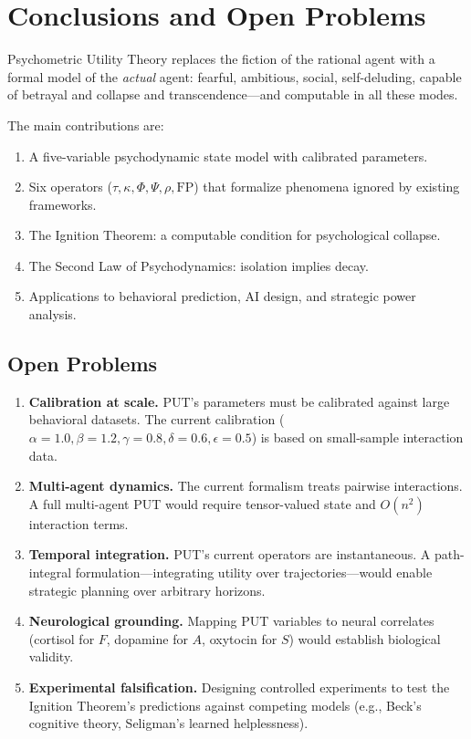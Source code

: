 \documentclass[12pt, a4paper]{article}
\theoremstyle{remark}
\begin{document}
\section{Conclusions and Open Problems}

Psychometric Utility Theory replaces the fiction of the rational agent
with a formal model of the \emph{actual} agent: fearful, ambitious,
social, self-deluding, capable of betrayal and collapse and
transcendence---and computable in all these modes.

The main contributions are:
\begin{enumerate}[nosep]
    \item A five-variable psychodynamic state model with calibrated
          parameters.
    \item Six operators ($\tau, \kappa, \Phi, \Psi, \rho, \text{FP}$)
          that formalize phenomena ignored by existing frameworks.
    \item The Ignition Theorem: a computable condition for psychological
          collapse.
    \item The Second Law of Psychodynamics: isolation implies decay.
    \item Applications to behavioral prediction, AI design, and strategic
          power analysis.
\end{enumerate}

\subsection{Open Problems}

\begin{enumerate}[nosep]
    \item \textbf{Calibration at scale.} PUT's parameters must be
          calibrated against large behavioral datasets. The current
          calibration ($\alpha = 1.0, \beta = 1.2, \gamma = 0.8,
          \delta = 0.6, \epsilon = 0.5$) is based on small-sample
          interaction data.
    \item \textbf{Multi-agent dynamics.} The current formalism treats
          pairwise interactions. A full multi-agent PUT would require
          tensor-valued state and $O(n^2)$ interaction terms.
    \item \textbf{Temporal integration.} PUT's current operators are
          instantaneous. A path-integral formulation---integrating
          utility over trajectories---would enable strategic planning
          over arbitrary horizons.
    \item \textbf{Neurological grounding.} Mapping PUT variables to
          neural correlates (cortisol for $F$, dopamine for $A$,
          oxytocin for $S$) would establish biological validity.
    \item \textbf{Experimental falsification.} Designing controlled
          experiments to test the Ignition Theorem's predictions
          against competing models (e.g., Beck's cognitive theory,
          Seligman's learned helplessness).
\end{enumerate}
\end{document}
